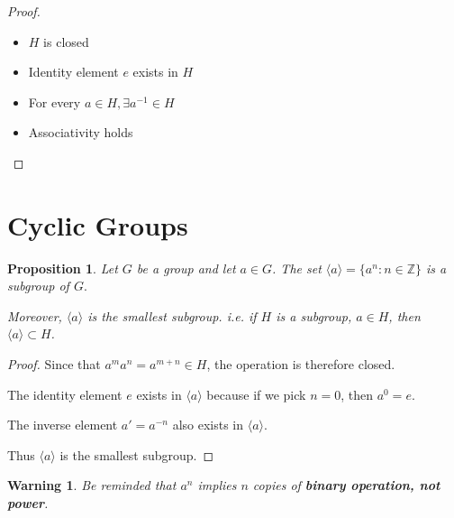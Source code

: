 \documentclass{article}
\theoremstyle{MyNonumberplain}
\theoremstyle{break}
\newtheorem*{proof}{Proof. }
\newtheorem{warning}{Warning}[section]
\theoremstyle{break}
\newtheorem{proposition}{Proposition}[section]
\theoremstyle{break}
\theoremstyle{definition}
\theoremstyle{break}
\begin{document}
\begin{thmbox}
\begin{prfbox}
\begin{proof}
            \begin{itemize}
                \item $H$ is closed\bigskip
                \item Identity element $e$ exists in $H$\bigskip
                \item For every $a\in H,\exists a^{-1}\in H$\bigskip
                \item Associativity holds
            \end{itemize}
    
        \end{proof}
    \end{prfbox}
    
\end{thmbox}

\newpage

\section{Cyclic Groups}

\begin{thmbox}
    \begin{proposition}
        Let $G$ be a group and let $a \in G$. The set $\langle a \rangle = \{ a^n : n \in \mathbb{Z} \}$ is a subgroup of $G.$\bigskip

        Moreover, $\langle a \rangle$ is the smallest subgroup. i.e. if $H$ is a subgroup, $a \in H$, then $\langle a \rangle \subset H$.
    \end{proposition}
    \begin{prfbox}
        \begin{proof}
            Since that $a^m a^n = a^{m + n} \in H$, the operation is therefore closed.\bigskip
    
            The identity element $e$ exists in $\langle a \rangle$ because if we pick $n = 0$, then
            $a^0 = e$.\bigskip
    
            The inverse element $a' = a^{- n}$ also exists in $\langle a \rangle$.\bigskip
    
            Thus $\langle a \rangle$ is the smallest subgroup.
        \end{proof}
    \end{prfbox}    
\end{thmbox}

\begin{warnbox}
    \begin{warning}
        Be reminded that $a^n$ implies $n$ copies of \textbf{binary operation, not
        power}.
    \end{warning}
\end{warnbox}
\end{document}
